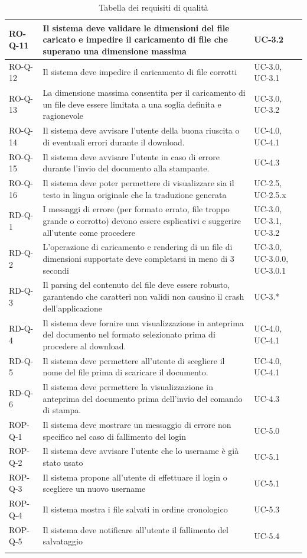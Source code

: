 \documentclass[11pt,a4paper]{article}
\begin{document}
\begin{longtable}{|p{}|>{\raggedright\arraybackslash}p{}|p{}|}
\hline
RO-Q-11 & Il sistema deve validare le dimensioni del file caricato e impedire il caricamento di file che superano una dimensione massima & UC-3.2 \\
\hline
RO-Q-12 & Il sistema deve impedire il caricamento di file corrotti & UC-3.0, UC-3.1\\
\hline
RO-Q-13 & La dimensione massima consentita per il caricamento di un file deve essere limitata a una soglia definita e ragionevole & UC-3.0, UC-3.2 \\
\hline
RO-Q-14 & Il sistema deve avvisare l'utente della buona riuscita o di eventuali errori durante il download. & UC-4.0, UC-4.1 \\
\hline
RO-Q-15 & Il sistema deve avvisare l’utente in caso di errore durante l’invio del documento alla stampante. & UC-4.3 \\
\hline
RO-Q-16 & Il sistema deve poter permettere di visualizzare sia il testo in lingua originale che la traduzione generata & UC-2.5, UC-2.5.x \\
\hline
RD-Q-1 & I messaggi di errore (per formato errato, file troppo grande o corrotto) devono essere esplicativi e suggerire all'utente come procedere & UC-3.0, UC-3.1, UC-3.2 \\
\hline
RD-Q-2 & L'operazione di caricamento e rendering di un file di dimensioni supportate deve completarsi in meno di 3 secondi & UC-3.0, UC-3.0.0, UC-3.0.1 \\
\hline
RD-Q-3 & Il parsing del contenuto del file deve essere robusto, garantendo che caratteri non validi non causino il crash dell'applicazione & UC-3.* \\
\hline
RD-Q-4 & Il sistema deve fornire una visualizzazione in anteprima del documento nel formato selezionato prima di procedere al download. & UC-4.0, UC-4.1 \\
\hline
RD-Q-5 & Il sistema deve permettere all'utente di scegliere il nome del file prima di scaricare il documento. & UC-4.0, UC-4.1 \\
\hline
RD-Q-6 & Il sistema deve permettere la visualizzazione in anteprima del documento prima dell'invio del comando di stampa. & UC-4.3 \\
\hline
ROP-Q-1 & Il sistema deve mostrare un messaggio di errore non specifico nel caso di fallimento del login & UC-5.0 \\
\hline
ROP-Q-2 & Il sistema deve avvisare l'utente che lo username è già stato usato & UC-5.1 \\
\hline
ROP-Q-3 & Il sistema propone all'utente di effettuare il login o scegliere un nuovo username & UC-5.1 \\
\hline
ROP-Q-4 & Il sistema mostra i file salvati in ordine cronologico & UC-5.3 \\
\hline
ROP-Q-5 & Il sistema deve notificare all'utente il fallimento del salvataggio & UC-5.4 \\
\hline
\addlinespace[1em]
\caption{Tabella dei requisiti di qualità}
\end{longtable}
\end{document}
